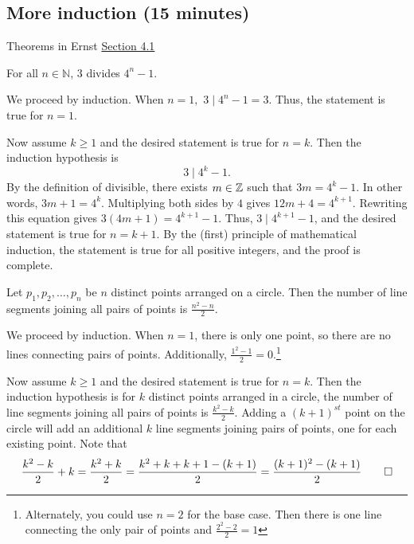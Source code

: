 \documentclass{ximera}
\begin{document}
\subsection{More induction (15 minutes)}


\begin{br}
Theorems in Ernst \href{https://danaernst.com/IBL-IntroToProof/pretext/sec_Intro_to_Induction.html}{Section 4.1} 
 

\begin{thm}
For all $n\in\mathbb{N}$, 3 divides $4^{n}-1$.
\end{thm}
\begin{solution}
We proceed by induction.  When $n=1,$ $3\mid 4^n-1=3$. Thus, the statement is true for $n=1.$

Now assume $k\geq 1$ and the desired statement is true for $n=k$. Then the induction hypothesis is \[3\mid 4^k-1.\]
By the definition of divisible, there exists $m\in\mathbb Z$ such that $3m=4^k-1.$ In other words, $3m+1=4^k$. Multiplying both sides by $4$ gives $12m+4=4^{k+1}$. Rewriting this equation gives $3(4m+1)=4^{k+1}-1$. Thus, $3\mid 4^{k+1}-1$, and the desired statement is true for $n=k+1$. By the (first) principle of mathematical induction, the statement is true for all positive integers, and the proof is complete.
\end{solution}

 \begin{thm}
 Let $p_{1}, p_{2}, \ldots, p_{n}$ be $n$ distinct points arranged on a circle.  Then the number of line segments joining all pairs of points is $\frac{n^{2}-n}{2}$.
 \end{thm}
\begin{solution}
 We proceed by induction. When $n=1$, there is only one point, so there are no lines connecting pairs of points. Additionally, $\frac{1^2-1}{2}=0$.\footnote{Alternately, you could use $n=2$ for the base case. Then there is one line connecting the only pair of points and $\frac{2^2-2}{2}=1$}
 
 Now assume $k\geq 1$ and the desired statement is true for $n=k$. Then the induction hypothesis is for $k$ distinct points arranged in a circle, the number of line segments joining all pairs of points is $\frac{k^{2}-k}{2}$. Adding a $(k+1)^{st}$ point on the circle will add an additional $k$ line segments joining pairs of points, one for each existing point. Note that 
 \[ 
 	\frac{k^{2}-k}{2}+k=\frac{k^{2}+k}{2}=
	\frac{k^2+k+k+1-(k+1)}{2}=\frac{(k+1)^{2}-(k+1)}{2}\qedhere
 \]
\end{solution}
\end{br}
\end{document}
